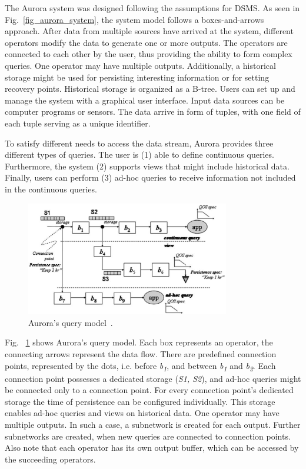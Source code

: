 The Aurora system was designed following the assumptions for DSMS. As seen in Fig.~\ref{fig_aurora_system}, the system model follows a boxes-and-arrows approach. After data from multiple sources have arrived at the system, different operators modify the data to generate one or more outputs. The operators are connected to each other by the user, thus providing the ability to form complex queries. One operator may have multiple outputs. Additionally, a historical storage might be used for persisting interesting information or for setting recovery points. Historical storage is organized as a B-tree. Users can set up and manage the system with a graphical user interface. Input data sources can be computer programs or sensors. The data arrive in form of tuples, with one field of each tuple serving as a unique identifier.

To satisfy different needs to access the data stream, Aurora provides three different types of queries. The user is (1) able to define continuous queries. Furthermore, the system (2) supports views that might include historical data. Finally, users can perform (3) ad-hoc queries to receive information not included in the continuous queries.

\begin{figure}[!t]
\centering
\includegraphics[width=3.5in]{./img/AuroraQueryModel.png}
\caption{Aurora's query model~\cite{Aurora2003}.}
\label{fig_aurora_query_model}
\end{figure}

Fig. ~\ref{fig_aurora_query_model} shows Aurora's query model. Each box represents an operator, the connecting arrows represent the data flow. There are predefined connection points, represented by the dots, i.e. before \textit{b\textsubscript{1}}, and between \textit{b\textsubscript{1}} and \textit{b\textsubscript{2}}. Each connection point possesses a dedicated storage (\textit{S1, S2}), and ad-hoc queries might be connected only to a connection point. For every connection point's dedicated storage the time of persistence can be configured individually. This storage enables ad-hoc queries and views on historical data. One operator may have multiple outputs. In such a case, a subnetwork is created for each output. Further subnetworks are created, when new queries are connected to connection points. Also note that each operator has its own output buffer, which can be accessed by the succeeding operators.

